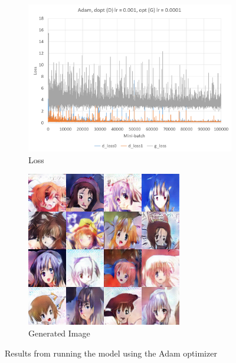 \documentclass{article} %
\begin{document}
\begin{figure}[h!]
	\centering
	\begin{subfigure}[b]{0.5\linewidth}
		\includegraphics[width=\linewidth]{rclui-02-Adam-dopt-0-001-opt-0-0001.png}
		\caption{Loss}
		\label{fig:kerasAdam02Loss}
	\end{subfigure}
	\begin{subfigure}[b]{0.35\linewidth}
		\includegraphics[width=\linewidth]{rclui-02-Adam-gen.png}
		\caption{Generated Image}
		\label{fig:kerasAdam02Gen}
	\end{subfigure}
	\caption{Results from running the model using the Adam optimizer}
	\label{fig:kerasAdam02}
\end{figure}
\end{document}

